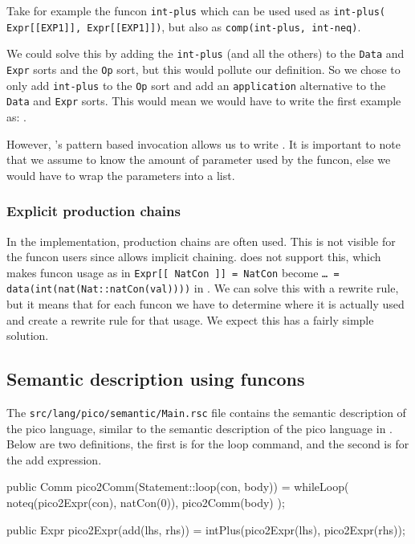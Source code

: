 \documentclass[a4paper, oneside, notitlepage]{article}
\newcommand{\ASFSDF}{\textsmaller{ASF\hspace{-.05em}\raisebox{.4ex}{\tiny\textbf{+}}SDF}\xspace}
\newcommand{\ADT}{\textsmaller{ADT}\xspace}
\newcommand{\filename}[1]{\texttt{#1}\xspace}
\newcommand{\code}[1]{\texttt{#1}\xspace}
\begin{document}
		Take for example the funcon \code{int-plus} which can be used used as 
		\code{int-plus(	Expr[[EXP1]], Expr[[EXP1]])}, 
		but also as 
		\code{comp(int-plus, int-neq)}.

		We could solve this by adding the \code{int-plus} (and all the others)
		to the \code{Data} and \code{Expr} sorts and the \code{Op} sort, but this would
		pollute our \ADT definition.
		So we chose to only add \code{int-plus} to the \code{Op} sort and add an
		\code{application} alternative to the \code{Data} and \code{Expr} sorts.
		This would mean we would have to write the first example as:
		.

		However, \Rascal's pattern based invocation allows us to write 
		.
		It is important to note that we assume to know the amount of parameter
		used by the funcon, else we would have to wrap the parameters
		into a list.

		\subsubsection{Explicit production chains}
		In the \ASFSDF implementation, production chains are often used.
		This is not visible for the funcon users since \ASFSDF allows implicit
		chaining.
		\Rascal does not support this, which makes funcon usage
		as in \code{Expr[[ NatCon ]] = NatCon} become
		\code{\ldots\ = data(int(nat(Nat::natCon(val))))} in \Rascal.
		We can solve this with a rewrite rule, but it means that for each funcon
		we have to determine where it is actually used and create a rewrite rule
		for that usage.
		We expect this has a fairly simple solution.
	
	\subsection{Semantic description using funcons}

		The \filename{src/lang/pico/semantic/Main.rsc} file contains the semantic
		description of the pico language, similar to the semantic description of
		the pico language in \ASFSDF.
		Below are two definitions, the first is for the loop command, and the
		second is for the add expression.

\begin{rascal}
public Comm pico2Comm(Statement::loop(con, body)) =
	whileLoop( 
		noteq(pico2Expr(con), natCon(0)), 
		pico2Comm(body)
	);

public Expr pico2Expr(add(lhs, rhs)) = intPlus(pico2Expr(lhs), pico2Expr(rhs));
\end{rascal}
\end{document}
